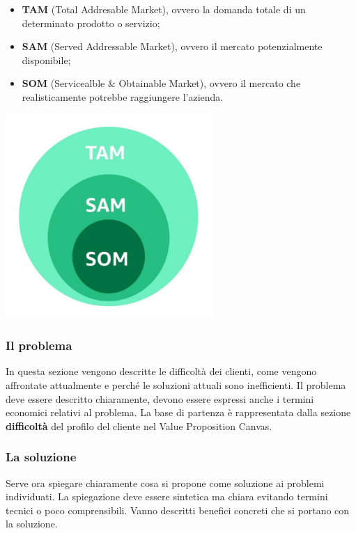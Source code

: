 \documentclass[14pt]{extarticle}
\begin{document}
\begin{itemize}
    \item \textbf{TAM} (Total Addresable Market), ovvero la domanda totale di un
    determinato prodotto o servizio;
    \item \textbf{SAM} (Served Addressable Market), ovvero il mercato
    potenzialmente disponibile;
    \item \textbf{SOM} (Servicealble \& Obtainable Market), ovvero il mercato
    che realisticamente potrebbe raggiungere l'azienda. 
\end{itemize}

\begin{center}
    \includegraphics{images/mercato.png}
\end{center}

\subsubsection{Il problema}

In questa sezione vengono descritte le difficoltà dei clienti, come vengono
affrontate attualmente e perché le soluzioni attuali sono inefficienti. Il
problema deve essere descritto chiaramente, devono essere espressi anche i
termini economici relativi al problema. La base di partenza è rappresentata
dalla sezione \textbf{difficoltà} del profilo del cliente nel Value Proposition
Canvas.

\subsubsection{La soluzione}

Serve ora spiegare chiaramente cosa si propone come soluzione ai problemi
individuati. La spiegazione deve essere sintetica ma chiara evitando termini
tecnici o poco comprensibili. Vanno descritti benefici concreti che si portano
con la soluzione.
\end{document}

